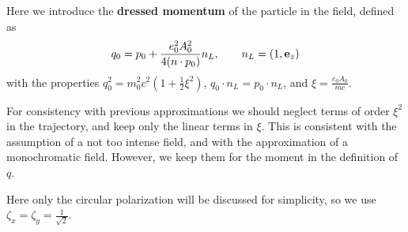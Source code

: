 \begin{importantbox}
  Here we introduce the {\bf dressed momentum} of the particle in the field, defined as
  \begin{align}
    q_0 = p_0 + \frac{e_0^2A_0^2}{4(n\cdot p_0)}n_L, \qquad n_L=(1,{\bf e}_z)
  \end{align}
  with the properties $q_0^2=m_0^2c^2(1+\frac12\xi^2)$, $q_0\cdot n_L=p_0\cdot n_L$, and $\xi=\frac{e_0A_0}{mc}$.
\end{importantbox}
\begin{importantbox}
  For consistency with previous approximations we should neglect terms of order $\xi^2$ in the trajectory, and keep only the linear terms in $\xi$. This is consistent with the assumption of a not too intense field, and with the approximation of a monochromatic field. However, we keep them for the moment in the definition of $q$.
\end{importantbox}

\begin{warningbox}{}
  Here only the circular polarization will be discussed for simplicity, so we use  $\zeta_x=\zeta_y=\frac{1}{\sqrt{2}}$.
\end{warningbox}

